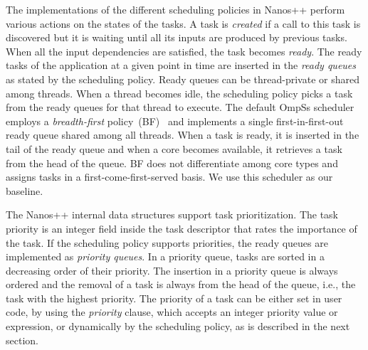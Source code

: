 The implementations of the different scheduling policies in Nanos++ perform various actions on the states of the tasks. A task is \textit{created} if a call to this task is discovered but it is waiting until all its inputs are produced by previous tasks. When all the input dependencies are satisfied, the task becomes \textit{ready}. The ready tasks of the application at a given point in time are inserted in the \textit{ready queues} as stated by the scheduling policy. Ready queues can be thread-private or shared among threads. When a thread becomes idle, the scheduling policy picks a task from the ready queues for that thread to execute. The default OmpSs scheduler employs a \textit{breadth-first} policy~(BF)~\cite{Duran_schedulers_08} and implements a single first-in-first-out ready queue shared among all threads. When a task is ready, it is inserted in the tail of the ready queue and when a core becomes available, it retrieves a task from the head of the queue. BF does not differentiate among core types and assigns tasks in a first-come-first-served basis. We use this scheduler as our baseline.

The Nanos++ internal data structures support task prioritization. The task priority is an integer field inside the task descriptor that rates the importance of the task. If the scheduling policy supports priorities, the ready queues are implemented as \textit{priority queues}. In a priority queue, tasks are sorted in a decreasing order of their priority. The insertion in a priority queue is always ordered and the removal of a task is always from the head of the queue, i.e., the task with the highest priority. The priority of a task can be either set in user code, by using the \textit{priority} clause, which accepts an integer priority value or expression, or dynamically  by the scheduling policy, as is described in the next section.

